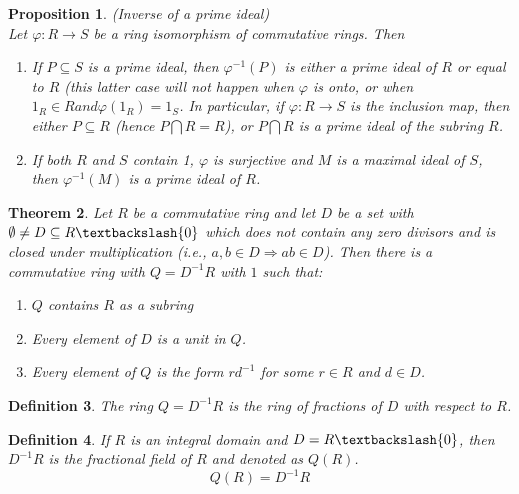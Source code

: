 \documentclass[a4paper,8pt]{article}
\newcommand{\hlt}[1]{\textit{{\color{blue}#1}}}
\theoremstyle{theorem}
\newtheorem{theorem}{Theorem}[subsection]
\newtheorem{proposition}[theorem]{Proposition}
\newtheorem{definition}[theorem]{Definition}
\begin{document}
\begin{proposition}
\hlt{(Inverse of a prime ideal)}\\
Let $\varphi: R \rightarrow S$ be a ring isomorphism of commutative rings. Then
\begin{enumerate}[label=(\roman*)]
\item If $P \subseteq S$ is a prime ideal, then $\varphi^{-1}(P)$ is either a prime ideal of $R$ or equal to $R$ (this latter case will not happen when $\varphi$ is onto, or when $1_R \in R and \varphi(1_R) = 1_S$. In particular, if $\varphi : R \rightarrow S$ is the inclusion map, then either $P \subseteq R$ (hence $P \bigcap R = R$), or $P \bigcap R$ is a prime ideal of the subring $R$.
\item If both $R$ and $S$ contain 1, $\varphi$ is surjective and $M$ is a maximal ideal of $S$, then $\varphi^{-1}(M)$ is a prime ideal of $R$.
\end{enumerate}
\end{proposition}


\begin{theorem}
Let $R$ be a commutative ring and let $D$ be a set with $\emptyset \neq D \subseteq R \textbackslash \{0\}$ which does not contain any zero divisors and is closed under multiplication (i.e., $a, b \in D \Rightarrow ab \in D$). Then there is a commutative ring with $Q = D^{-1}R$ with $1$ such that:
\begin{enumerate}[label=(\roman*)]
\item $Q$ contains $R$ as a subring
\item Every element of $D$ is a unit in $Q$.
\item Every element of $Q$ is the form $r d^{-1}$ for some $r \in R$ and $d \in D$.
\end{enumerate}
\end{theorem}

\begin{definition}
The ring $Q = D^{-1}R$ is the \hlt{ring of fractions of $D$ with respect to $R$}.
\end{definition}

\begin{definition}
If $R$ is an integral domain and $D = R \textbackslash \{0\}$, then $D ^ {-1}R$ is the \hlt{fractional field of $R$} and denoted as $Q(R)$.
\begin{equation}
Q(R) = D ^{-1}R \nonumber
\end{equation}
\end{definition}
\end{document}

